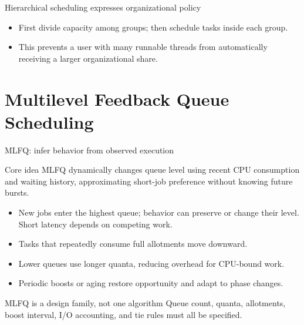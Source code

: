 \documentclass[aspectratio=169,11pt]{beamer}
\begin{document}
\begin{frame}{Hierarchical scheduling expresses organizational policy}
  \begin{center}
  \end{center}
  \begin{itemize}
    \item First divide capacity among groups; then schedule tasks inside each group.
    \item This prevents a user with many runnable threads from automatically receiving a larger organizational share.
  \end{itemize}
\end{frame}

\section{Multilevel Feedback Queue Scheduling}

\begin{frame}{MLFQ: infer behavior from observed execution}
  \begin{block}{Core idea}
    MLFQ dynamically changes queue level using recent CPU consumption and waiting history, approximating short-job preference without knowing future bursts.
  \end{block}
  \begin{itemize}
    \item New jobs enter the highest queue; behavior can preserve or change their level. Short latency depends on competing work.
    \item Tasks that repeatedly consume full allotments move downward.
    \item Lower queues use longer quanta, reducing overhead for CPU-bound work.
    \item Periodic boosts or aging restore opportunity and adapt to phase changes.
  \end{itemize}
  \begin{alertblock}{MLFQ is a design family, not one algorithm}
    Queue count, quanta, allotments, boost interval, I/O accounting, and tie rules must all be specified.
  \end{alertblock}
\end{frame}
\end{document}
